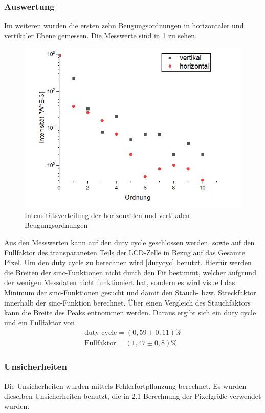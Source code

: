 \subsubsection{Auswertung}
Im weiteren wurden die ersten zehn Beugungsordnungen in horizontaler und vertikaler Ebene gemessen. Die Messwerte sind in \cref{horiz} zu sehen.
\begin{figure}[h!]
	\centering
	\includegraphics[scale = 1]{horizundvertik.png}
	\caption{Intensitätsverteilung der horizonatlen und vertikalen Beugungsordnungen}
	\label{horiz}
\end{figure}
Aus den Messwerten kann auf den duty cycle geschlossen werden, sowie auf den Füllfaktor des transparaneten Teils der LCD-Zelle in Bezug auf das Gesamte Pixel. Um den duty cycle zu berechnen wird \cref{dutycyc} benutzt. Hierfür werden die Breiten der sinc-Funktionen nicht durch den Fit bestimmt, welcher aufgrund der wenigen Messdaten nicht funktioniert hat, sondern es wird visuell das Minimum der sinc-Funktionen gesucht und damit den Stauch- bzw. Streckfaktor innerhalb der sinc-Funktion berechnet. Über einen Vergleich des Stauchfaktors kann die Breite des Peaks entnommen werden.
Daraus ergibt sich ein duty cycle und ein Füllfaktor von 
\begin{align}
	\text{duty cycle} = (0,59 \pm 0,11)\% \\
	\text{Füllfaktor} = (1,47 \pm 0,8)\%
\end{align}
\subsubsection{Unsicherheiten}
Die Unsicherheiten wurden mittels Fehlerfortpflanzung berechnet. Es wurden dieselben Unsicherheiten benutzt, die in 2.1 Berechnung der Pixelgröße verwendet wurden.
